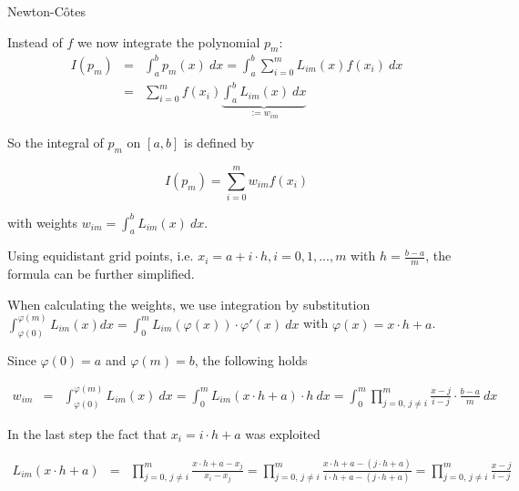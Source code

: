 \documentclass[11pt,compress,t,notes=noshow, xcolor=table]{beamer}
\begin{document}
\begin{vbframe}{Newton-C\^{o}tes}

Instead of $f$ we now integrate the polynomial $p_m$:
\begin{eqnarray*}
I(p_m) &=& \int_{a}^{b} p_m(x)~dx = \int_{a}^{b} \sum_{i = 0}^m L_{im}(x)f(x_{i})~dx \\
&=& \sum_{i = 0}^m f(x_{i}) \underbrace{\int_{a}^{b}  L_{im}(x)~dx}_{:=w_{im}}
\end{eqnarray*}

So the integral of $p_m$ on $[a, b]$ is defined by

$$
I(p_m) = \sum_{i = 0}^m w_{im} f(x_{i})
$$

with weights $w_{im} = \int_a^b L_{im}(x)~dx$.

\framebreak

Using equidistant grid points, i.e. $x_i = a + i \cdot h, i = 0, 1, ..., m$ with $h = \frac{b - a}{m}$, the formula can be further simplified.

\lz

When calculating the weights, we use integration by substitution $\int_{\varphi(0)}^{\varphi(m)} L_{im}(x) dx = \int_0^m L_{im}(\varphi(x))\cdot \varphi'(x)~dx $ with $\varphi(x) = x \cdot h + a$.

Since $\varphi(0) = a$ and $\varphi(m) = b$, the following holds

\begin{footnotesize}
\begin{eqnarray*}
w_{im} &=& \int_{\varphi(0)}^{\varphi(m)} L_{im}(x)~dx =  \int_0^m L_{im}(x \cdot h + a) \cdot h ~dx = \int_0^m \prod_{j = 0,\, j \not= i}^m \frac{x - j}{i - j} \cdot \frac{b - a}{m}~dx
\end{eqnarray*}
\end{footnotesize}

In the last step the fact that $x_i = i \cdot h + a$ was exploited

\begin{footnotesize}
\begin{eqnarray*}
L_{im}(x \cdot h + a) &=& \prod_{j = 0,\, j \not= i}^m \frac{x \cdot h + a  - x_{j}}{x_{i} - x_{j}} = \prod_{j = 0,\, j \not= i}^m \frac{x \cdot h + a  - (j \cdot h + a)}{i \cdot h + a - (j \cdot h + a)} = \prod_{j = 0,\, j \not= i}^m \frac{x - j}{i - j}
\end{eqnarray*}
\end{footnotesize}

\framebreak

%
%
%
%
%


\end{vbframe}
\end{document}
